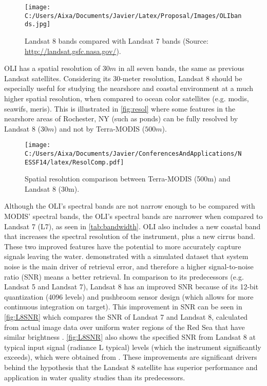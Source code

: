 \begin{figure}[htb]
\centering
      \texttt{[image: C:/Users/Aixa/Documents/Javier/Latex/Proposal/Images/OLIbands.jpg]}
      \caption{Landsat 8 bands compared with Landsat 7 bands (Source: \protect\url{http://landsat.gsfc.nasa.gov/}).}
      \label{fig:olibands}
\end{figure}

OLI has a spatial resolution of $30m$ in all seven bands, the same as previous Landsat satellites. Considering its 30-meter resolution, Landsat 8 should be especially useful for studying the nearshore and coastal environment at a much higher spatial resolution, when compared to ocean color satellites (e.g. \gls{modis}, \gls{seawifs}, \gls{meris}). This is illustrated in \autoref{fig:resol} where some features in the nearshore areas of Rochester, NY (such as ponds) can be fully resolved by Landsat 8 ($30m$) and not by Terra-MODIS ($500m$).

\begin{figure}[htb]
  \centering
  \texttt{[image: C:/Users/Aixa/Documents/Javier/ConferencesAndApplications/NESSF14/latex/ResolComp.pdf]}
  \caption{Spatial resolution comparison between Terra-MODIS (500m) and Landsat 8 (30m). \label{fig:resol} } 
\end{figure}

Although the OLI's spectral bands are not narrow enough to be compared with MODIS' spectral bands, the OLI's spectral bands are narrower when compared to Landsat 7 (L7), as seen in \autoref{tab:bandwidth}. OLI also includes a new coastal band that increases the spectral resolution of the instrument, plus a new cirrus band. These two improved features have the potential to more accurately capture signals leaving the water. \cite{Gerace:2013} demonstrated with a simulated dataset that system noise is the main driver of retrieval error, and therefore a higher signal-to-noise ratio (SNR) means a better retrieval. In comparison to its predecessors (e.g. Landsat 5 and Landsat 7), Landsat 8 has an improved SNR because of its 12-bit quantization (4096 levels) and pushbroom sensor design (which allows for more continuous integration on target). This improvement in SNR can be seen in \autoref{fig:L8SNR} which compares the SNR of Landsat 7 and Landsat 8, calculated from actual image data over uniform water regions of the Red Sea that have similar brightness \cite{Hu:2012}. \autoref{fig:L8SNR} also shows the specified SNR from Landsat 8 at typical input signal (radiance L typical) levels (which the instrument significantly exceeds), which were obtained from \cite{Irons:2012}. These improvements are significant drivers behind the hypothesis that the Landsat 8 satellite has superior performance and application in water quality studies than its predecessors.


